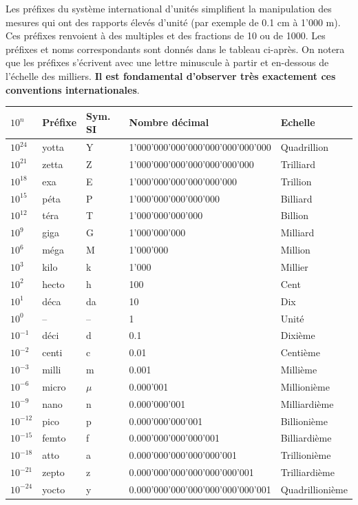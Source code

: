 Les préfixes du système international d'unités simplifient la manipulation des mesures qui ont des rapports élevés d'unité (par exemple de 0.1 cm à 1'000 m). Ces préfixes renvoient à des multiples et des fractions de 10 ou de 1000.  Les préfixes et noms correspondants sont donnés dans le tableau ci-après. On notera que les préfixes s'écrivent avec une lettre minuscule à partir et en-dessous de l'échelle des milliers. \textbf{Il est fondamental d'observer très exactement ces conventions internationales}.

\begin{table}[htbp]
\begin{center}
\begin{tabular}{>{\pbs\raggedright}p{1cm}>{\pbs\raggedright}p{1.4cm}>{\pbs\centering}p{1.5cm}ll}
$10^n$ & Préfixe & Sym. SI & Nombre décimal & Echelle \\ \hline
$10^{24}$  & yotta &     Y & 1'000'000'000'000'000'000'000'000 & Quadrillion \\
$10^{21}$  & zetta &     Z & 1'000'000'000'000'000'000'000 & Trilliard \\
$10^{18}$  &   exa &     E & 1'000'000'000'000'000'000 & Trillion \\
$10^{15}$  &  péta &     P & 1'000'000'000'000'000 & Billiard \\
$10^{12}$  &  téra &     T & 1'000'000'000'000 & Billion \\
$10^{9}$   &  giga &     G & 1'000'000'000 & Milliard \\
$10^{6}$   &  méga &     M & 1'000'000 & Million \\
$10^{3}$   &  kilo &     k & 1'000 & Millier \\
$10^{2}$   & hecto &     h & 100 & Cent \\
$10^{1}$   &  déca &    da & 10 & Dix \\
$10^{0}$   &   --  &    -- & 1 & Unité \\
$10^{-1}$  &  déci &     d & 0.1	& Dixième \\
$10^{-2}$  & centi &     c & 0.01 & Centième \\
$10^{-3}$  & milli &     m & 0.001 & Millième \\
$10^{-6}$  & micro & $\mu$ & 0.000'001 & Millionième \\
$10^{-9}$  &  nano &     n & 0.000'000'001 & Milliardième \\
$10^{-12	}$ &  pico &     p & 0.000'000'000'001 & Billionième \\
$10^{-15	}$ & femto &     f & 0.000'000'000'000'001 & Billiardième \\
$10^{-18	}$ &  atto &     a & 0.000'000'000'000'000'001 & Trillionième \\
$10^{-21	}$ & zepto &     z & 0.000'000'000'000'000'000'001 & Trilliardième \\
$10^{-24	}$ & yocto &     y & 0.000'000'000'000'000'000'000'001 & Quadrillionième \\ \hline
\end{tabular}
\end{center}
\end{table}

